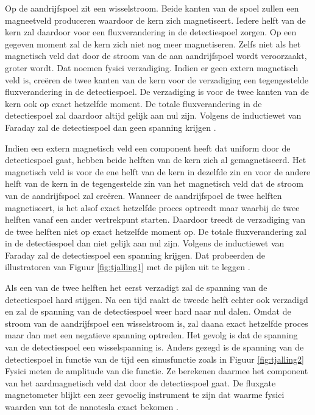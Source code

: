 \documentclass[12pt,a4paper]{article}
\begin{document}
Op de aandrijfspoel zit een wisselstroom. Beide kanten van de spoel zullen een magneetveld produceren waardoor de kern zich magnetiseert.
Iedere helft van de kern zal daardoor voor een fluxverandering in de detectiespoel zorgen.
Op een gegeven moment zal de kern zich niet nog meer magnetiseren.
Zelfs niet als het magnetisch veld dat door de stroom van de aan aandrijfspoel wordt veroorzaakt, groter wordt.
Dat noemen fysici verzadiging. Indien er geen extern magnetisch veld is, creëren de twee kanten van de kern voor de verzadiging een tegengestelde fluxverandering in de detectiespoel.
De verzadiging is voor de twee kanten van de kern ook op exact hetzelfde moment. De totale fluxverandering in de detectiespoel zal daardoor altijd gelijk aan nul zijn.
Volgens de inductiewet van Faraday zal de detectiespoel dan geen spanning krijgen \cite{tjalling_imperial}.

Indien een extern magnetisch veld een component heeft dat uniform door de detectiespoel gaat, hebben beide helften van de kern zich al gemagnetiseerd.
Het magnetisch veld is voor de ene helft van de kern in dezelfde zin en voor de andere helft van de kern in de tegengestelde zin van het magnetisch veld dat de stroom van de aandrijfspoel zal creëren.
Wanneer de aandrijfspoel de twee helften magnetiseert, is het alsof exact hetzelfde proces optreedt maar waarbij de twee helften vanaf een ander vertrekpunt starten.
Daardoor treedt de verzadiging van de twee helften niet op exact hetzelfde moment op. De totale fluxverandering zal in de detectiespoel dan niet gelijk aan nul zijn.
Volgens de inductiewet van Faraday zal de detectiespoel een spanning krijgen. Dat probeerden de illustratoren van Figuur \ref{fig:tjalling1} met de pijlen uit te leggen \cite{tjalling_imperial}.

Als een van de twee helften het eerst verzadigt zal de spanning van de detectiespoel hard stijgen.
Na een tijd raakt de tweede helft echter ook verzadigd en zal de spanning van de detectiespoel weer hard naar nul dalen.
Omdat de stroom van de aandrijfspoel een wisselstroom is, zal daana exact hetzelfde proces maar dan met een negatieve spanning optreden.
Het gevolg is dat de spanning van de detectiespoel een wisselspanning is. Anders gezegd is de spanning van de detectiespoel in functie van de tijd een sinusfunctie zoals in Figuur \ref{fig:tjalling2}
Fysici meten de amplitude van die functie. Ze berekenen daarmee het component van het aardmagnetisch veld dat door de detectiespoel gaat.
De fluxgate magnetometer blijkt een zeer gevoelig instrument te zijn dat waarme fysici waarden van tot de nanotesla exact bekomen \cite{tjalling_imperial}.
\end{document}
